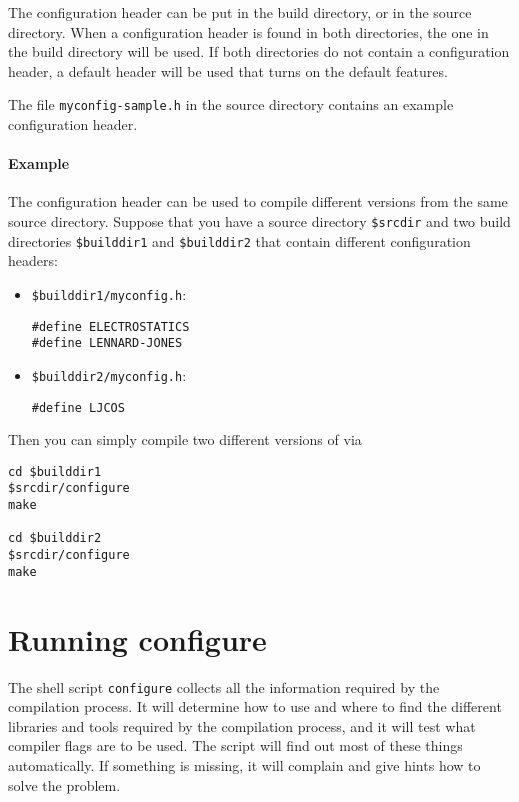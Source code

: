 The configuration header can be put in the build directory, or in the
source directory. When a configuration header is found in both
directories, the one in the build directory will be used. If both
directories do not contain a configuration header, a default header
will be used that turns on the default features.

The file \texttt{myconfig-sample.h} in the source directory contains
an example configuration header.

\paragraph{Example}
The configuration header can be used to compile different versions
from the same source directory. Suppose that you have a source
directory \texttt{\$srcdir} and two build directories
\texttt{\$builddir1} and \texttt{\$builddir2} that contain different
configuration headers:

\begin{itemize}
\item \texttt{\$builddir1/myconfig.h}:
\begin{verbatim}
#define ELECTROSTATICS
#define LENNARD-JONES
\end{verbatim}

\item \texttt{\$builddir2/myconfig.h}:
\begin{verbatim}
#define LJCOS
\end{verbatim}
\end{itemize}

\noindent Then you can simply compile two different versions of \es{} via
\begin{verbatim}
cd $builddir1
$srcdir/configure
make

cd $builddir2
$srcdir/configure
make
\end{verbatim}


\section{Running configure}
\label{sec:configure}

The shell script \texttt{configure} collects all the information
required by the compilation process. It will determine how to use and
where to find the different libraries and tools required by the
compilation process, and it will test what compiler flags are to be
used.  The script will find out most of these things automatically.
If something is missing, it will complain and give hints how to solve
the problem.

